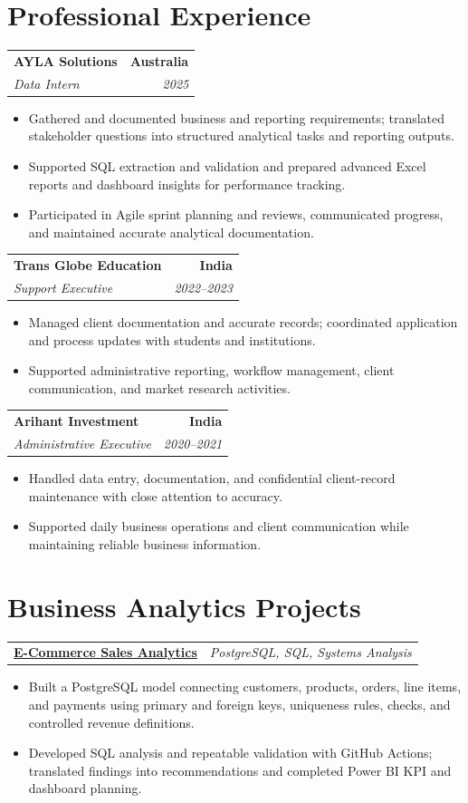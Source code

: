 \documentclass[letterpaper,10pt]{article}
\makeatletter
\newcommand{\role}[4]{%
  \begin{tabularx}{\textwidth}{@{}Xr@{}}
    \textbf{#1} & \textbf{#2} \\
    \textit{#3} & \textit{#4}
  \end{tabularx}\vspace{-1pt}
}
\newcommand{\project}[2]{%
  \begin{tabularx}{\textwidth}{@{}Xr@{}}
    \textbf{#1} & \textit{#2}
  \end{tabularx}\vspace{-1pt}
}
\makeatother
\begin{document}
\section{Professional Experience}
\role{AYLA Solutions}{Australia}{Data Intern}{2025}
\begin{itemize}
  \item Gathered and documented business and reporting requirements; translated stakeholder questions into structured analytical tasks and reporting outputs.
  \item Supported SQL extraction and validation and prepared advanced Excel reports and dashboard insights for performance tracking.
  \item Participated in Agile sprint planning and reviews, communicated progress, and maintained accurate analytical documentation.
\end{itemize}
\vspace{1pt}

\role{Trans Globe Education}{India}{Support Executive}{2022--2023}
\begin{itemize}
  \item Managed client documentation and accurate records; coordinated application and process updates with students and institutions.
  \item Supported administrative reporting, workflow management, client communication, and market research activities.
\end{itemize}
\vspace{1pt}

\role{Arihant Investment}{India}{Administrative Executive}{2020--2021}
\begin{itemize}
  \item Handled data entry, documentation, and confidential client-record maintenance with close attention to accuracy.
  \item Supported daily business operations and client communication while maintaining reliable business information.
\end{itemize}

\section{Business Analytics Projects}
\project{\href{https://github.com/jainalimehta/Ecommerce-Sales-Analytics}{E-Commerce Sales Analytics}}{PostgreSQL, SQL, Systems Analysis}
\begin{itemize}
  \item Built a PostgreSQL model connecting customers, products, orders, line items, and payments using primary and foreign keys, uniqueness rules, checks, and controlled revenue definitions.
  \item Developed SQL analysis and repeatable validation with GitHub Actions; translated findings into recommendations and completed Power BI KPI and dashboard planning.
\end{itemize}
\vspace{1pt}
\end{document}
